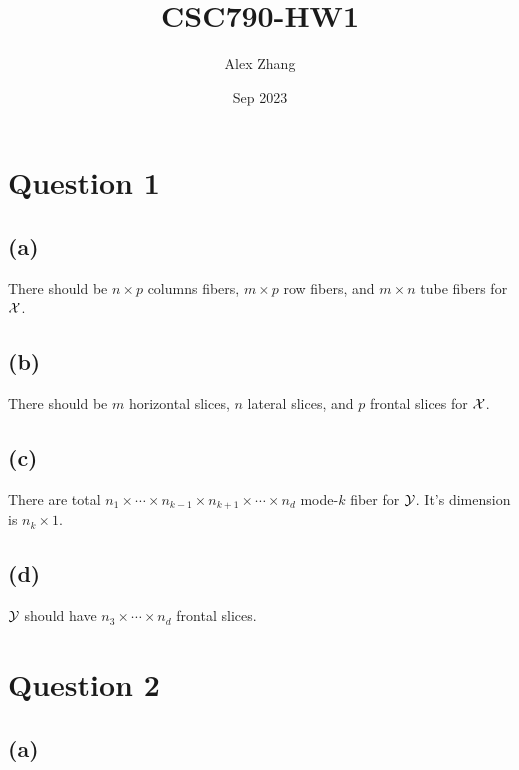 \documentclass{article}
\title{CSC790-HW1}
\author{Alex Zhang}
\date{Sep 2023}
\newcommand{\T}[2][]{#1{\mathbf{\cal{#2}}}} 						%
\begin{document}
\maketitle


\section*{Question 1}
\subsection*{(a)}
There should be $n \times p$ columns fibers, $m \times p$ row fibers, and $m \times n$ tube fibers for $\T[]{X}$.
\subsection*{(b)}
There should be $m$ horizontal slices, $n$ lateral slices, and $p$ frontal slices for $\T[]{X}$.
\subsection*{(c)}
There are total $n_1 \times \cdots \times n_{k-1} \times n_{k+1} \times \cdots \times n_d$ mode-$k$ fiber for $\T[]{Y}$.
It's dimension is $n_k \times 1$.
\subsection*{(d)}
$\T[]{Y}$ should have $n_3 \times \cdots \times n_d$ frontal slices.
\section*{Question 2}
\subsection*{(a)}
\end{document}
